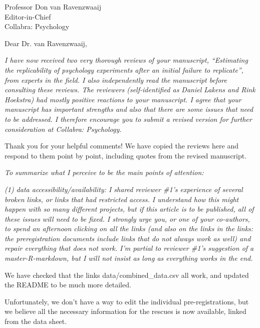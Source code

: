 \documentclass{stanfordletter}
\newcommand{\theysaid}[1]{\begin{leftbar} \noindent 
		\textsl{ #1}\end{leftbar}}
\begin{document}
\signature{\vspace{-35pt} Veronica Boyce, \\ on behalf of the author team}


\begin{letter}{Professor Don van Ravenzwaaij \\ Editor-in-Chief \\ Collabra: Psychology }
	
	
	\opening{Dear Dr. van Ravenzwaaij,} 
		
		
		
		\theysaid{I have now received two very thorough reviews of your manuscript, “Estimating the replicability of psychology experiments after an initial failure to replicate”, from experts in the field. I also independently read the manuscript before consulting these reviews. The reviewers (self-identified as Daniel Lakens and Rink Hoekstra) had mostly positive reactions to your manuscript. I agree that your manuscript has important strengths and also that there are some issues that need to be addressed. I therefore encourage you to submit a revised version for further consideration at Collabra: Psychology.}
		
		Thank you for your helpful comments! We have copied the reviews here and respond to them point by point, including quotes from the revised manuscript. 
		
		\theysaid{To summarize what I perceive to be the main points of attention:}
		
		\theysaid{(1) data accessibility/availability: I shared reviewer \#1’s experience of several broken links, or links that had restricted access. I understand how this might happen with so many different projects, but if this article is to be published, all of these issues will need to be fixed. I strongly urge you, or one of your co-authors, to spend an afternoon clicking on all the links (and also on the links in the links: the preregistration documents include links that do not always work as well) and repair everything that does not work. I’m partial to reviewer \#1’s suggestion of a master-R-markdown, but I will not insist as long as everything works in the end.}
		
		
		We have checked that the links data/combined\_data.csv
		all work, and updated the README to be much more detailed. 
		
		Unfortunately, we don't have a way to edit the individual pre-registrations, but we believe all the necessary information for the rescues is now available, linked from the data sheet. 
		

\end{letter}
\end{document}
